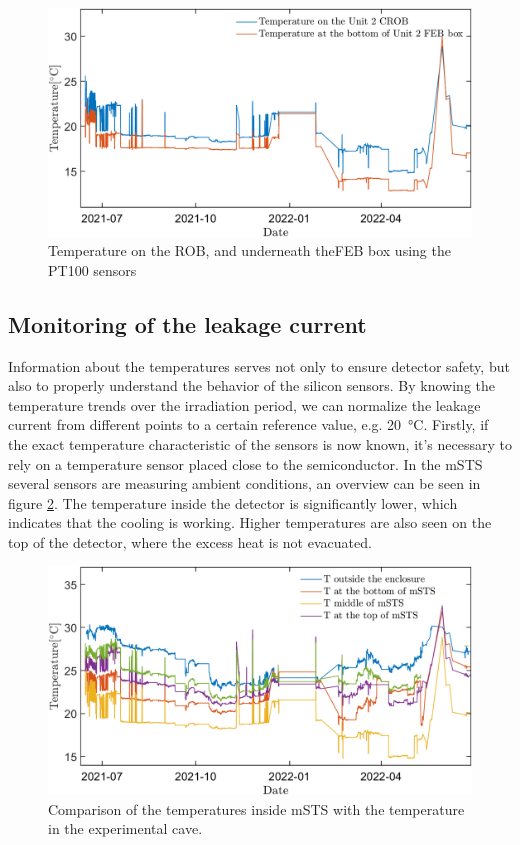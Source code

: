 \begin{figure}[!h]
\centering
\includegraphics[width=0.9\columnwidth]{Chapter6/DCS/images/ROBvsFEB.png}
\caption{Temperature on the \gls{ROB}, and underneath the\gls{FEB} box using the PT100 sensors}
\label{fig_robvsfeb}
\end{figure}

\newpage

\subsection{Monitoring of the leakage current}

Information about the temperatures serves not only to ensure detector safety, but also to properly understand the behavior of the silicon sensors. By knowing the temperature trends over the irradiation period, we can normalize the leakage current from different points to a certain reference value, e.g. \SI{20}{\celsius}. Firstly, if the exact temperature characteristic of the sensors is now known, it's necessary to rely on a temperature sensor placed close to the semiconductor. In the \gls{mSTS} several sensors are measuring ambient conditions, an overview can be seen in figure \ref{fig_temperatures}. The temperature inside the detector is significantly lower, which indicates that the cooling is working. Higher temperatures are also seen on the top of the detector, where the excess heat is not evacuated. 

\begin{figure}[!h]
\centering
\includegraphics[width=0.9\columnwidth]{Chapter6/DCS/images/rates/tempmSTS.png}
\caption{Comparison of the temperatures inside \gls{mSTS} with the temperature in the experimental cave.}
\label{fig_temperatures}
\end{figure}

